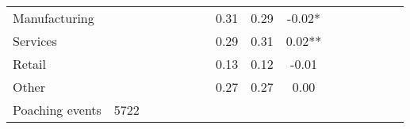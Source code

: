 {\begin{tabular}{l*{5}{ccc}}
Manufacturing       &            &            &            &            &            &            &        0.31&        0.29&       -0.02*  \\
Services            &            &            &            &            &            &            &        0.29&        0.31&        0.02** \\
Retail              &            &            &            &            &            &            &        0.13&        0.12&       -0.01   \\
Other               &            &            &            &            &            &            &        0.27&        0.27&        0.00   \\
\midrule
Poaching events     &        5722&            &            &            &            &            &            &            &               \\
\bottomrule
\end{tabular}
}
